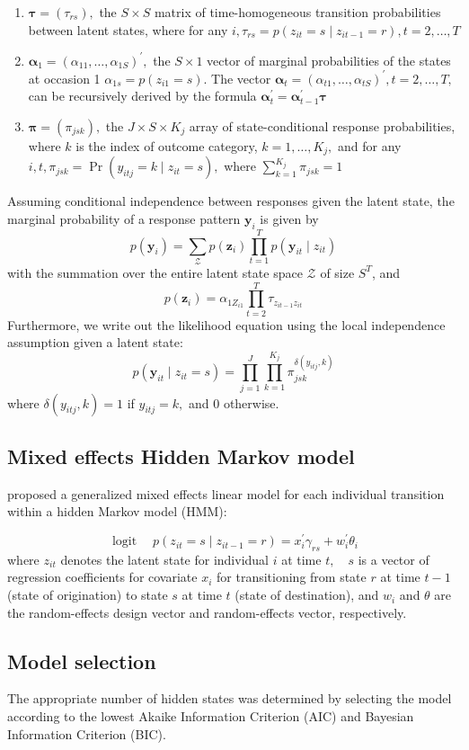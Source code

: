 \documentclass[12pt]{article}
\numberwithin{equation}{section}
\begin{document}
\begin{enumerate}
	\item   $\boldsymbol{\tau}=\left(\tau_{r s}\right),$ the $S\times S$ matrix of time-homogeneous transition probabilities between latent states, where for any $i, \tau_{r s}=p\left(z_{i t}=s \mid z_{i t-1}=r\right), t=2, \ldots, T$
	\item  $\boldsymbol{\alpha}_{1}=\left(\alpha_{11}, \ldots, \alpha_{1 S}\right)^{\prime},$ the $S \times 1$ vector of marginal probabilities of the states at occasion 1 $\alpha_{1 s}=p\left(z_{i 1}=s\right) .$ The vector $\boldsymbol{\alpha}_{t}=\left(\alpha_{t 1}, \ldots, \alpha_{t S}\right)^{\prime}, t=2, \ldots, T,$ can be recursively derived
by the formula $\boldsymbol{\alpha}_{t}^{\prime}=\boldsymbol{\alpha}_{t-1}^{\prime} \boldsymbol{\tau}$

	\item$\boldsymbol{\pi}=\left(\pi_{j s k}\right),$ the $J \times S \times K_{j}$ array of state-conditional response probabilities, where $k$ is the index of outcome category, $k=1, \ldots, K_{j},$ and for any $i, t, \pi_{j s k}=\operatorname{Pr}\left(y_{i t j}=k \mid z_{i t}=s\right),$ where $\sum_{k=1}^{K_{j}} \pi_{j s k}=1$
\end{enumerate} 

Assuming conditional independence between responses given the latent state, the marginal probability of a response pattern $\mathbf{y}_{i}$ is given by
\[
p\left(\mathbf{y}_{i}\right)=\sum_{\mathcal{Z}} p\left(\mathbf{z}_{i}\right) \prod_{t=1}^{T} p\left(\mathbf{y}_{i t} \mid z_{i t}\right)
\]
with the summation over the entire latent state space $\mathscr{Z}$ of size $S^{T}$, and
\[
p\left(\mathbf{z}_{i}\right)=\alpha_{1 Z_{i 1}} \prod_{t=2}^{T} \tau_{z_{i t-1} z_{i t}}
\]
Furthermore, we write out the likelihood equation using the local independence assumption given a latent state:
\[
p\left(\mathbf{y}_{i t} \mid z_{i t}=s\right)=\prod_{j=1}^{J} \prod_{k=1}^{K_{j}} \pi_{j s k}^{\delta\left(y_{i t j}, k\right)}
\]
where $\delta\left(y_{i t j}, k\right)=1$ if $y_{i t j}=k,$ and 0 otherwise.

\subsection{Mixed effects Hidden Markov model}
\citet{altman2007mixed} proposed a generalized mixed effects linear model for each individual transition within a hidden Markov model (HMM):

\[
\operatorname{logit} \quad p\left(z_{i t}=s \mid z_{i t-1}=r\right)=x_{i}^{\prime} \gamma_{r s}+w_{i}^{\prime} \theta_{i}
\]
where $z_{i t}$ denotes the latent state for individual $i$ at time $t, \quad s$ is a vector of regression coefficients for covariate $x_{i}$ for transitioning from state $r$ at time $t-1$ (state of origination) to state $s$ at time $t$ (state of destination), and $w_{i}$ and $\theta$ are the random-effects design vector and random-effects vector, respectively.

\subsection{Model selection}

The appropriate number of hidden states was determined by selecting the model according to the lowest Akaike Information Criterion (AIC) and Bayesian Information Criterion (BIC). 



\end{document}
